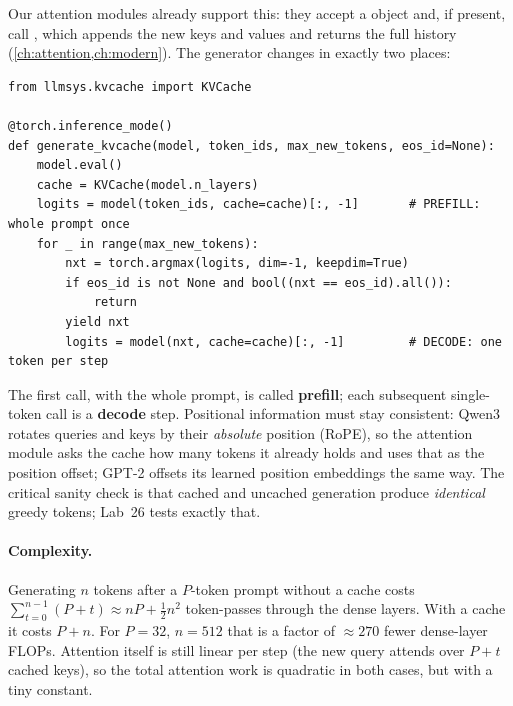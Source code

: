 Our attention modules already support this: they accept a  object and, if present,
call , which appends the new keys and values and returns
the full history (\cref{ch:attention,ch:modern}). The generator changes in exactly two places:

\begin{lstlisting}[caption={Greedy generation with a KV cache (Lab 26, Task 2).},label={lst:inference:cache}]
from llmsys.kvcache import KVCache

@torch.inference_mode()
def generate_kvcache(model, token_ids, max_new_tokens, eos_id=None):
    model.eval()
    cache = KVCache(model.n_layers)
    logits = model(token_ids, cache=cache)[:, -1]       # PREFILL: whole prompt once
    for _ in range(max_new_tokens):
        nxt = torch.argmax(logits, dim=-1, keepdim=True)
        if eos_id is not None and bool((nxt == eos_id).all()):
            return
        yield nxt
        logits = model(nxt, cache=cache)[:, -1]         # DECODE: one token per step
\end{lstlisting}

The first call, with the whole prompt, is called \textbf{prefill}; each subsequent single-token
call is a \textbf{decode} step. Positional information must stay consistent: Qwen3 rotates queries
and keys by their \emph{absolute} position (RoPE), so the attention module asks the cache how many
tokens it already holds and uses that as the position offset; GPT-2 offsets its learned position
embeddings the same way. The critical sanity check is that cached and uncached generation produce
\emph{identical} greedy tokens; Lab~26 tests exactly that.

\paragraph{Complexity.} Generating $n$ tokens after a $P$-token prompt without a cache costs
$\sum_{t=0}^{n-1}(P+t)\approx nP+\tfrac{1}{2}n^2$ token-passes through the dense layers. With a
cache it costs $P+n$. For $P=32$, $n=512$ that is a factor of $\approx270$ fewer dense-layer FLOPs.
Attention itself is still linear per step (the new query attends over $P+t$ cached keys), so the
total attention work is quadratic in both cases, but with a tiny constant.

